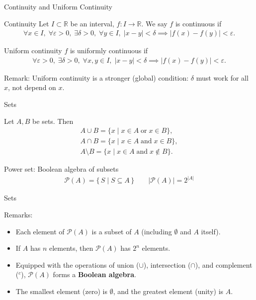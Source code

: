 \documentclass[11pt,aspectratio=43,ignorenonframetext,t]{beamer}
\begin{document}
\begin{frame}{Continuity and Uniform Continuity}
\begin{block}{Continuity}
Let \(I \subset \mathbb{R}\) be an interval, \(f: I \to \mathbb{R}\). We say \(f\) is continuous if
\begin{align*}
\forall x \in I,\; \forall \varepsilon>0,\; \exists \delta>0,\; \forall y \in I,\;
|x-y|<\delta \implies |f(x) - f(y)| < \varepsilon.
\end{align*}
\end{block}
\begin{block}{Uniform continuity} \(f\) is uniformly continuous if
\begin{align*}
\forall \varepsilon>0,\; \exists \delta>0,\; \forall x,y \in I,\;
|x-y|<\delta \implies |f(x) - f(y)| < \varepsilon.
\end{align*}
\end{block}
\vspace{-0.8cm}
\begin{block}{Remark:}
    Uniform continuity is a stronger (global) condition: \(\delta\) must work for all \(x\), not depend on \(x\).
\end{block}
\end{frame}


\begin{frame}{Sets}
\begin{block}{Let \(A, B\) be sets.}
Then\vspace{-0.5cm}
\begin{align*}
A \cup B = \{ x \mid x\in A \;\text{or}\; x\in B\}, \\
A \cap B = \{ x \mid x\in A \;\text{and}\; x\in B\}, \\
A \setminus B = \{ x \mid x\in A \;\text{and}\; x\notin B\}.    
\end{align*}    
\end{block}

\begin{block}{Power set:}
Boolean algebra of subsets
\begin{align*}
\mathcal{P}(A) = \{\, S \mid S \subseteq A \,\}\qquad |\mathcal{P}(A)| = 2^{|A|}
\end{align*}

\end{block}
\end{frame}

\begin{frame}{Sets}
\begin{block}{Remarks:}
\begin{itemize}
  \item Each element of $\mathcal{P}(A)$ is a subset of $A$ (including $\emptyset$ and $A$ itself).
  \item If $A$ has $n$ elements, then $\mathcal{P}(A)$ has $2^n$ elements.
  \item Equipped with the operations of union ($\cup$), intersection ($\cap$), and complement ($^c$), $\mathcal{P}(A)$ forms a \textbf{Boolean algebra}.
  \item The smallest element (zero) is $\emptyset$, and the greatest element (unity) is $A$.
\end{itemize}
\end{block}
\end{frame}
\end{document}
